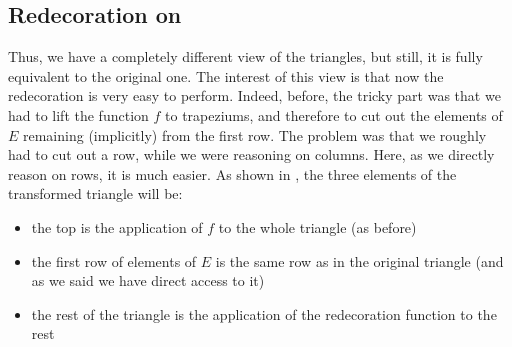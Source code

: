 \subsection{Redecoration on \TriS{}}
Thus, we have a completely different view of the triangles, but still,
it is fully equivalent to the original one.  The interest of this view
is that now the redecoration is very easy to perform. Indeed, before,
the tricky part was that we had to lift the function $f$ to
trapeziums, and therefore to cut out the elements of $E$ remaining
(implicitly) from the first row. The problem was that we roughly had to
cut out a row, while we were reasoning on columns. Here, as we
directly reason on rows, it is much easier. As shown in ,
the three elements of the transformed triangle will be:
\begin{itemize}
  \item the top is the application of $f$ to the whole triangle (as before)
  \item the first row of elements of $E$ is  the same row as in the original
    triangle (and as we said we have direct access to it)
  \item the rest of the triangle is the application of the redecoration
    function to the rest
\end{itemize}

